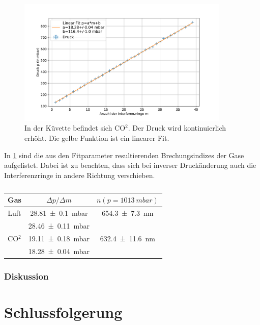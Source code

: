\documentclass[
	a4paper,
	12pt,
	pagesize,
	ngerman
]{scrartcl}
\begin{document}
\begin{figure}[H]
		\includegraphics[width=0.9\textwidth]{images/CO2_Rein.pdf}
		\centering
		\caption{In der Küvette befindet sich CO$^2$. Der Druck wird kontinuierlich erhöht. Die gelbe Funktion ist ein linearer Fit.}
		\label{fig_co2_rein}
	\end{figure}

	In \cref{tb_gase} sind die aus den Fitparameter resultierenden Brechungsindizes der Gase aufgelistet.
	Dabei ist zu beachten, dass sich bei inverser Druckänderung auch die Interferenzringe in andere Richtung verschieben.


	\begin{table}[H]
		\centering
		\begin{tabular}{| c | c | c |}
			\hline
			  Gas &  $\Delta p/\Delta m$ & $n(p=\SI{1013}{mbar})$\\ \hline
				Luft& \SI{28.81+-0.1}{mbar} & \SI{654.3+-7.3}{nm}\\
				&\SI{28.46+-0.11}{mbar}&\\
				CO$^2$ & \SI{19.11+-0.18}{mbar} & \SI{632.4+-11.6}{nm}\\
				&\SI{18.28+-0.04}{mbar}&\\
				\hline
		\end{tabular}
		\caption{}
		\label{tb_gase}
	\end{table}

	\subsubsection{Diskussion}


	\section{Schlussfolgerung}

	\printbibliography
\end{document}
